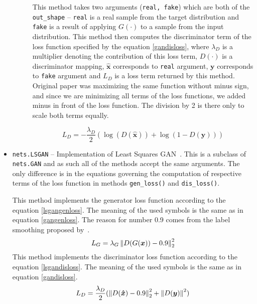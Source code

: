 \begin{itemize}
\begin{description}
 This method takes two arguments (\texttt{real, fake}) which are both of the \texttt{out\_shape} -- \texttt{real} is a real sample from the target distribution and \texttt{fake} is a result of applying $G(\cdot)$ to a sample from the input distribution. This method then computes the discriminator term of the loss function specified by the equation \ref{gandisloss}, where $\lambda_D$ is a multiplier denoting the contribution of this loss term, $D(\cdot)$ is a discriminator mapping, $\bm{\hat{x}}$ corresponds to \texttt{real} argument, $\bm{y}$ corresponds to \texttt{fake} argument and $L_D$ is a loss term returned by this method. Original paper was maximizing the same function without minus sign, and since we are minimizing all terms of the loss functions, we added minus in front of the loss function. The division by 2 is there only to scale both terms equally.

\begin{equation}
L_D = -\frac{\lambda_D}{2} (\log(D(\bm{\hat{x}})) + \log(1 - D(\bm{y})))
\label{gandisloss}
\end{equation}

\end{description}

\item \texttt{nets.LSGAN} -- Implementation of Least Squares GAN~\cite{lsgan}. This is a subclass of \texttt{nets.GAN} and as such all of the methods accept the same arguments. The only difference is in the equations governing the computation of respective terms of the loss function in methods \texttt{gen\_loss()} and \texttt{dis\_loss()}.
\begin{description}
 This method implements the generator loss function according to the equation \ref{lsgangenloss}. The meaning of the used symbols is the same as in equation \ref{gangenloss}. The reason for number 0.9 comes from the label smoothing proposed by~\cite{improvedgan,smooth}.
\begin{equation}
L_G = \lambda_G \left\lVert D(G(\bm{x})) - 0.9\right\rVert_2^2
\label{lsgangenloss}
\end{equation}
 This  method implements the discriminator loss function according to the equation \ref{lsgandisloss}. The meaning of the used symbols is the same as in equation \ref{gandisloss}.
\begin{equation}
L_D = \frac{\lambda_D}{2} (\left\lVert D(\bm{\hat{x}}) - 0.9\right\rVert_2^2 + \left\lVert D(\bm{y})\right\rVert^2)
\label{lsgandisloss}
\end{equation}


\end{description}
\end{itemize}
